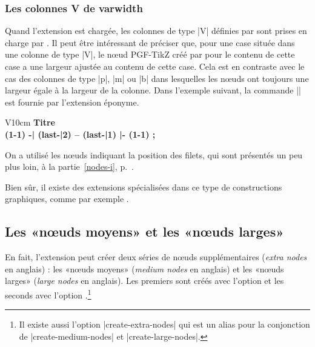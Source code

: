 \documentclass[dvipsnames]{article}
\begin{document}
\subsubsection{Les colonnes V de varwidth}

\label{node-V}

Quand l'extension  est chargée, les colonnes de type |V| définies
par  sont prises en charge par . Il peut être
intéressant de préciser que, pour une case située dans une colonne de type
|V|, le nœud PGF-TikZ créé par  pour le contenu de cette case
a une largeur ajustée au contenu de cette case. Cela est en contraste avec le
cas des colonnes de type |p|, |m| ou |b| dans lesquelles les nœuds ont toujours
une largeur égale à la largeur de la colonne. Dans l'exemple suivant, la
commande |\lipsum| est fournie par l'extension éponyme.

\medskip
\begin{Code}
\begin{NiceTabular}{V{10cm}}
  \bfseries \large 
  Titre \\
  \lipsum[1][1-4]
\CodeAfter 
  \tikz {} (1-1) -| (last-|2) -- (last-|1) |- (1-1) ; 
\end{NiceTabular}
\end{Code}


On a utilisé les nœuds indiquant la position des filets, qui sont présentés un
peu plus loin, à la partie~\ref{nodes-i}, p.~\pageref{nodes-i}.

Bien sûr, il existe des extensions spécialisées dans ce type de constructions
graphiques, comme par exemple .


\subsection{Les «nœuds moyens» et les «nœuds larges»}


En fait, l'extension  peut créer deux séries de nœuds
supplémentaires (\emph{extra nodes} en anglais) : les «nœuds moyens»
(\emph{medium nodes} en anglais) et les «nœuds larges» (\emph{large nodes} en
anglais). Les premiers sont créés avec l'option 
et les seconds avec l'option .\footnote{Il existe
  aussi l'option |create-extra-nodes| qui est un alias pour la conjonction de
  |create-medium-nodes| et |create-large-nodes|.}
\end{document}
